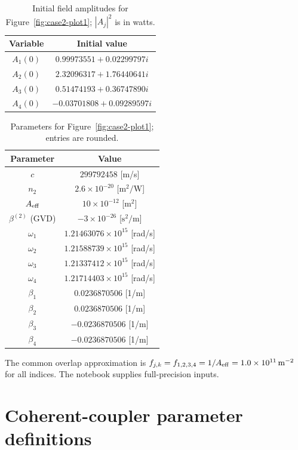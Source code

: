 \documentclass[11pt,a4paper]{article}
\numberwithin{equation}{section}
\begin{document}
\begin{table}[H]\centering
\caption{Initial field amplitudes for Figure~\ref{fig:case2-plot1}; $|A_j|^2$ is in watts.}
\label{tab:case2-init}
\begin{tabular}{cc}\hline Variable & Initial value \\ \hline
$A_1(0)$ & $0.99973551+0.02299797i$ \\
$A_2(0)$ & $2.32096317+1.76440641i$ \\
$A_3(0)$ & $0.51474193+0.36747890i$ \\
$A_4(0)$ & $-0.03701808+0.09289597i$ \\
\hline\end{tabular}\end{table}
\begin{table}[H]\centering
\caption{Parameters for Figure~\ref{fig:case2-plot1}; entries are rounded.}
\label{tab:case2-physical}
\begin{tabular}{cc}\hline Parameter & Value \\ \hline
$c$ & $299792458$ [m/s] \\
$n_2$ & $2.6\times10^{-20}$ [$\mathrm m^2/\mathrm W$] \\
$A_{\rm eff}$ & $10\times10^{-12}$ [$\mathrm m^2$] \\
$\beta^{(2)}$ (GVD) & $-3\times10^{-26}$ [$\mathrm s^2/\mathrm m$] \\
$\omega_1$ & $1.21463076\times10^{15}$ [rad/s] \\
$\omega_2$ & $1.21588739\times10^{15}$ [rad/s] \\
$\omega_3$ & $1.21337412\times10^{15}$ [rad/s] \\
$\omega_4$ & $1.21714403\times10^{15}$ [rad/s] \\
$\beta_1$ & $0.0236870506$ [1/m] \\
$\beta_2$ & $0.0236870506$ [1/m] \\
$\beta_3$ & $-0.0236870506$ [1/m] \\
$\beta_4$ & $-0.0236870506$ [1/m] \\
\hline\end{tabular}\end{table}
The common overlap approximation is $f_{j,k}=f_{1,2,3,4}=1/A_{\rm eff}=1.0\times10^{11}\,\mathrm m^{-2}$ for all indices.
The notebook supplies full-precision inputs.

\section{Coherent-coupler parameter definitions}
\label{cc:app:param-def-appendix}
\end{document}
